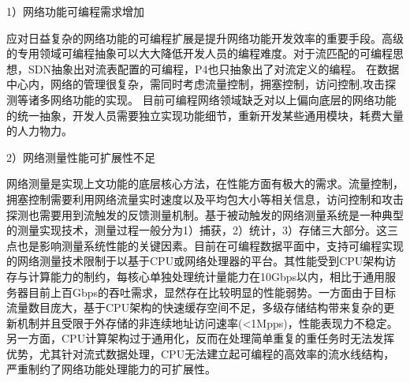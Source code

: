 1）网络功能可编程需求增加

应对日益复杂的网络功能的可编程扩展是提升网络功能开发效率的重要手段。高级的专用领域可编程抽象可以大大降低开发人员的编程难度。对于流匹配的可编程思想，SDN抽象出对流表配置的可编程，P4也只抽象出了对流定义的编程。
在数据中心内，网络的管理很复杂，需同时考虑流量控制，拥塞控制，访问控制,攻击探测等诸多网络功能的实现。
目前可编程网络领域缺乏对以上偏向底层的网络功能的统一抽象，开发人员需要独立实现功能细节，重新开发某些通用模块，耗费大量的人力物力。


2）网络测量性能可扩展性不足

网络测量是实现上文功能的底层核心方法，在性能方面有极大的需求。流量控制，拥塞控制需要利用网络流量实时速度以及平均包大小等相关信息，访问控制和攻击探测也需要用到流触发的反馈测量机制。基于被动触发的网络测量系统是一种典型的测量实现技术，测量过程一般分为1）捕获，2）统计，3）存储三大部分。这三点也是影响测量系统性能的关键因素。目前在可编程数据平面中，支持可编程实现的网络测量技术限制于以基于CPU或网络处理器的平台。其性能受到CPU架构访存与计算能力的制约，每核心单独处理统计量能力在10Gbps以内，相比于通用服务器目前上百Gbps的吞吐需求，显然存在比较明显的性能弱势。一方面由于目标流量数目庞大，基于CPU架构的快速缓存空间不足，多级存储结构带来复杂的更新机制并且受限于外存储的非连续地址访问速率(<1Mpps)，性能表现力不稳定。另一方面，CPU计算架构过于通用化，反而在处理简单重复的重任务时无法发挥优势，尤其针对流式数据处理，CPU无法建立起可编程的高效率的流水线结构，严重制约了网络功能处理能力的可扩展性。



%
%
%
%
%
%
%



